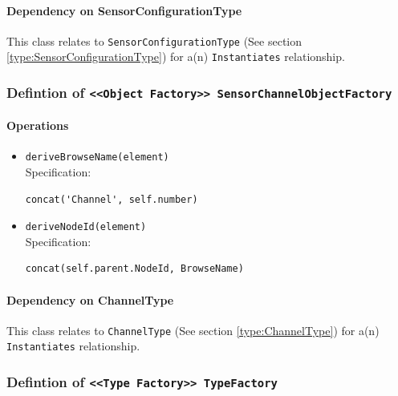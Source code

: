 \paragraph{Dependency on SensorConfigurationType}

This class relates to \texttt{SensorConfigurationType} (See section \ref{type:SensorConfigurationType}) for a(n) \texttt{Instantiates} relationship.

\FloatBarrier
\subsubsection{Defintion of \texttt{<<Object Factory>> SensorChannelObjectFactory}} \label{type:SensorChannelObjectFactory}

\FloatBarrier



\paragraph{Operations}
\begin{itemize}
  \item \texttt{deriveBrowseName(element)}\\
    Specification:
   \indent \begin{lstlisting}
concat('Channel', self.number)
\end{lstlisting}

  \item \texttt{deriveNodeId(element)}\\
    Specification:
   \indent \begin{lstlisting}
concat(self.parent.NodeId, BrowseName)
\end{lstlisting}

\end{itemize}
\paragraph{Dependency on ChannelType}

This class relates to \texttt{ChannelType} (See section \ref{type:ChannelType}) for a(n) \texttt{Instantiates} relationship.

\FloatBarrier
\subsubsection{Defintion of \texttt{<<Type Factory>> TypeFactory}} \label{type:TypeFactory}

\FloatBarrier



